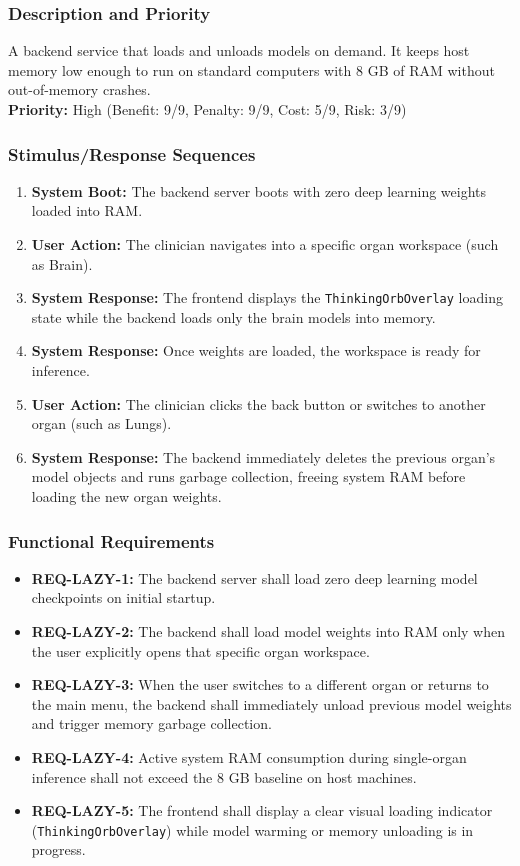 \documentclass[12pt,a4paper]{report}
\begin{document}
\subsubsection{Description and Priority}
A backend service that loads and unloads models on demand. It keeps host memory low enough to run on standard computers with 8 GB of RAM without out-of-memory crashes.\\
\textbf{Priority:} High (Benefit: 9/9, Penalty: 9/9, Cost: 5/9, Risk: 3/9)

\subsubsection{Stimulus/Response Sequences}
\begin{enumerate}
    \item \textbf{System Boot:} The backend server boots with zero deep learning weights loaded into RAM.
    \item \textbf{User Action:} The clinician navigates into a specific organ workspace (such as Brain).
    \item \textbf{System Response:} The frontend displays the \texttt{ThinkingOrbOverlay} loading state while the backend loads only the brain models into memory.
    \item \textbf{System Response:} Once weights are loaded, the workspace is ready for inference.
    \item \textbf{User Action:} The clinician clicks the back button or switches to another organ (such as Lungs).
    \item \textbf{System Response:} The backend immediately deletes the previous organ's model objects and runs garbage collection, freeing system RAM before loading the new organ weights.
\end{enumerate}

\subsubsection{Functional Requirements}
\begin{itemize}
    \item \textbf{REQ-LAZY-1:} The backend server shall load zero deep learning model checkpoints on initial startup.
    \item \textbf{REQ-LAZY-2:} The backend shall load model weights into RAM only when the user explicitly opens that specific organ workspace.
    \item \textbf{REQ-LAZY-3:} When the user switches to a different organ or returns to the main menu, the backend shall immediately unload previous model weights and trigger memory garbage collection.
    \item \textbf{REQ-LAZY-4:} Active system RAM consumption during single-organ inference shall not exceed the 8 GB baseline on host machines.
    \item \textbf{REQ-LAZY-5:} The frontend shall display a clear visual loading indicator (\texttt{ThinkingOrbOverlay}) while model warming or memory unloading is in progress.
\end{itemize}
\end{document}
